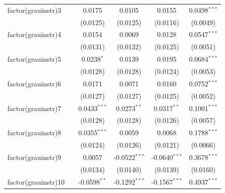 \begin{tabular}{lccccc}
   factor(grauinstr)3       &                & 0.0175                 & 0.0105                  & 0.0155                  & 0.0498$^{***}$\\   
                            &                & (0.0125)               & (0.0125)                & (0.0116)                & (0.0049)\\   
   factor(grauinstr)4       &                & 0.0154                 & 0.0069                  & 0.0128                  & 0.0547$^{***}$\\   
                            &                & (0.0131)               & (0.0132)                & (0.0125)                & (0.0051)\\   
   factor(grauinstr)5       &                & 0.0238$^{*}$           & 0.0139                  & 0.0195                  & 0.0684$^{***}$\\   
                            &                & (0.0128)               & (0.0128)                & (0.0124)                & (0.0053)\\   
   factor(grauinstr)6       &                & 0.0171                 & 0.0071                  & 0.0160                  & 0.0752$^{***}$\\   
                            &                & (0.0127)               & (0.0127)                & (0.0125)                & (0.0052)\\   
   factor(grauinstr)7       &                & 0.0433$^{***}$         & 0.0273$^{**}$           & 0.0317$^{**}$           & 0.1001$^{***}$\\   
                            &                & (0.0128)               & (0.0128)                & (0.0126)                & (0.0057)\\   
   factor(grauinstr)8       &                & 0.0355$^{***}$         & 0.0059                  & 0.0068                  & 0.1788$^{***}$\\   
                            &                & (0.0124)               & (0.0126)                & (0.0121)                & (0.0066)\\   
   factor(grauinstr)9       &                & 0.0057                 & -0.0522$^{***}$         & -0.0640$^{***}$         & 0.3678$^{***}$\\   
                            &                & (0.0134)               & (0.0140)                & (0.0139)                & (0.0160)\\   
   factor(grauinstr)10      &                & -0.0598$^{**}$         & -0.1292$^{***}$         & -0.1567$^{***}$         & 0.4937$^{***}$\\   

\end{tabular}
